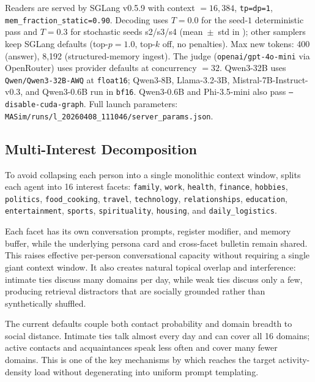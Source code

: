 Readers are served by SGLang v0.5.9 with context $=16{,}384$, \texttt{tp=dp=1}, \texttt{mem\_fraction\_static=0.90}. Decoding uses $T=0.0$ for the seed-$1$ deterministic pass and $T=0.3$ for stochastic seeds s2/s3/s4 (mean~$\pm$~std in ); other samplers keep SGLang defaults (top-$p=1.0$, top-$k$ off, no penalties). Max new tokens: 400 (answer), 8{,}192 (structured-memory ingest). The judge (\texttt{openai/gpt-4o-mini} via OpenRouter) uses provider defaults at concurrency $=32$. Qwen3-32B uses \texttt{Qwen/Qwen3-32B-AWQ} at \texttt{float16}; Qwen3-8B, Llama-3.2-3B, Mistral-7B-Instruct-v0.3, and Qwen3-0.6B run in \texttt{bf16}. Qwen3-0.6B and Phi-3.5-mini also pass \texttt{--disable-cuda-graph}. Full launch parameters: \texttt{MASim/runs/l\_20260408\_111046/server\_params.json}.

\subsection{Multi-Interest Decomposition}
\label{app:multi-interest}

To avoid collapsing each person into a single monolithic context window, \masim splits each agent into 16 interest facets:
\texttt{family}, \texttt{work}, \texttt{health}, \texttt{finance}, \texttt{hobbies}, \texttt{politics}, \texttt{food\_cooking}, \texttt{travel}, \texttt{technology}, \texttt{relationships}, \texttt{education}, \texttt{entertainment}, \texttt{sports}, \texttt{spirituality}, \texttt{housing}, and \texttt{daily\_logistics}.

Each facet has its own conversation prompts, register modifier, and memory buffer, while the underlying persona card and cross-facet bulletin remain shared.
This raises effective per-person conversational capacity without requiring a single giant context window.
It also creates natural topical overlap and interference: intimate ties discuss many domains per day, while weak ties discuss only a few, producing retrieval distractors that are socially grounded rather than synthetically shuffled.

The current defaults couple both contact probability and domain breadth to social distance.
Intimate ties talk almost every day and can cover all 16 domains; active contacts and acquaintances speak less often and cover many fewer domains.
This is one of the key mechanisms by which \benchmark reaches the target activity-density load without degenerating into uniform prompt templating.

